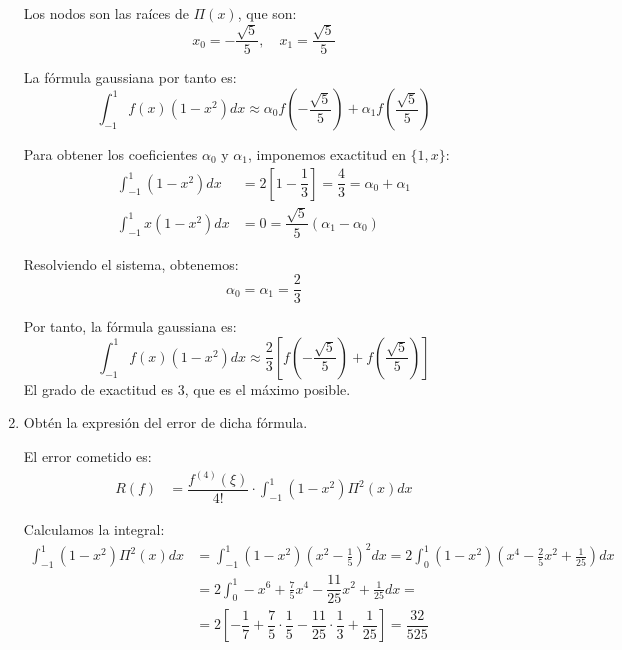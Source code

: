 \begin{ejercicio}[DGIIM 2023/24]
\begin{enumerate}
        Los nodos son las raíces de $\Pi(x)$, que son:
        \begin{equation*}
            x_0 = -\dfrac{\sqrt{5}}{5}, \quad x_1 = \dfrac{\sqrt{5}}{5}
        \end{equation*}

        La fórmula gaussiana por tanto es:
        \begin{equation*}
            \int_{-1}^{1} f(x)(1 - x^2)dx \approx \alpha_0 f\left(-\dfrac{\sqrt{5}}{5}\right) + \alpha_1 f\left(\dfrac{\sqrt{5}}{5}\right)
        \end{equation*}

        Para obtener los coeficientes $\alpha_0$ y $\alpha_1$, imponemos exactitud en $\{1, x\}$:
        \begin{align*}
            \int_{-1}^{1} (1 - x^2)dx &= 2\left[1 - \dfrac{1}{3}\right] = \dfrac{4}{3} = \alpha_0 + \alpha_1\\
            \int_{-1}^{1} x(1 - x^2)dx &= 0 = \dfrac{\sqrt{5}}{5}\left(\alpha_1 - \alpha_0\right)
        \end{align*}

        Resolviendo el sistema, obtenemos:
        \begin{equation*}
            \alpha_0 = \alpha_1 = \dfrac{2}{3}
        \end{equation*}

        Por tanto, la fórmula gaussiana es:
        \begin{equation*}
            \int_{-1}^{1} f(x)(1 - x^2)dx \approx \dfrac{2}{3}\left[f\left(-\dfrac{\sqrt{5}}{5}\right) + f\left(\dfrac{\sqrt{5}}{5}\right)\right]
        \end{equation*}
        El grado de exactitud es $3$, que es el máximo posible.
        \item Obtén la expresión del error de dicha fórmula.
        
        El error cometido es:
        \begin{align*}
            R(f) &= \dfrac{f^{(4)}(\xi)}{4!}\cdot \int_{-1}^{1} (1 - x^2)\Pi^2(x)dx
        \end{align*}

        Calculamos la integral:
        \begin{align*}
            \int_{-1}^{1} (1 - x^2)\Pi^2(x)dx &= \int_{-1}^{1} (1 - x^2)\left(x^2 - \frac{1}{5}\right)^2dx
            = 2\int_{0}^{1} (1 - x^2)\left(x^4 - \frac{2}{5}x^2 + \frac{1}{25}\right)dx\\
            &= 2\int_{0}^{1} -x^6 + \frac{7}{5}x^4 - \dfrac{11}{25}x^2 + \frac{1}{25}dx
            =\\&= 2\left[-\dfrac{1}{7} + \dfrac{7}{5}\cdot \dfrac{1}{5} - \dfrac{11}{25}\cdot \dfrac{1}{3} + \dfrac{1}{25}\right]
            = \dfrac{32}{525}
        \end{align*}


\end{enumerate}
\end{ejercicio}
